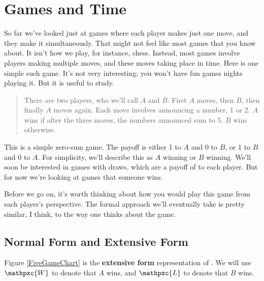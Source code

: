 \chapter{Games and Time}

So far we've looked just at games where each player makes just one move, and they make it simultaneously. That might not feel like most games that you know about. It isn't how we play, for instance, chess. Instead, most games involve players making multiple moves, and these moves taking place in time. Here is one simple such game. It's not very interesting; you won't have fun games nights playing it. But it is useful to study.

\begin{quote}

There are two players, who we'll call $A$ and $B$. First $A$ moves, then $B$, then finally $A$ moves again. Each move involves announcing a number, 1 or 2. $A$ wins if after the three moves, the numbers announced sum to 5. $B$ wins otherwise. 
\end{quote}


\noindent This is a simple zero-sum game. The payoff is either 1 to $A$ and 0 to $B$, or 1 to $B$ and 0 to $A$. For simplicity, we'll describe this as $A$ winning or $B$ winning. We'll soon be interested in games with draws, which are a payoff of  to each player. But for now we're looking at games that someone wins. 

Before we go on, it's worth thinking about how you would play this game from each player's perspective. The formal approach we'll eventually take is pretty similar, I think, to the way one thinks about the game.


\section{Normal Form and Extensive Form}

Figure \ref{FiveGameChart} is the \textbf{extensive form} representation of . We will use $\mathpzc{W}$ to denote that $A$ wins, and $\mathpzc{L}$ to denote that $B$ wins. 


